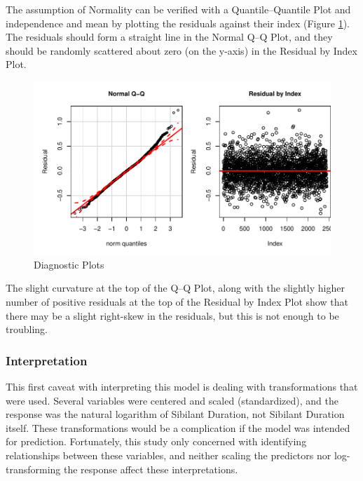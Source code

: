 \documentclass[a4paper]{article}
\begin{document}
The assumption of Normality can be verified with a Quantile--Quantile
Plot and independence and mean by plotting the
residuals against their index (Figure \ref{fig:sib.dur.res}).  The
residuals should form a straight line in the Normal Q--Q Plot, and
they should be randomly scattered about zero (on the y-axis) in the Residual by Index Plot.


\begin{figure}[h!]
  \begin{center}
    \begin{minipage}[t]{0.8\linewidth}
      \begin{center}
\includegraphics{prelim-056}
      \end{center}
    \end{minipage}
    \caption{Diagnostic Plots}
    \label{fig:sib.dur.res}
  \end{center}
\end{figure}

The slight curvature at the top of the Q--Q Plot, along with the
slightly higher number of positive residuals at the top of the
Residual by Index Plot show that there may be a slight right-skew in
the residuals, but this is not enough to be troubling.

\subsubsection*{Interpretation}
This first caveat with interpreting this model is dealing with
transformations that were used.  Several variables were centered and
scaled (standardized), and the response was the natural logarithm of
Sibilant Duration, not Sibilant Duration itself.  These
transformations would be a complication if the model was intended for
prediction. Fortunately, this study  only concerned with identifying
relationships between these variables, and neither scaling the
predictors nor log-transforming the response affect these
interpretations.
\end{document}
